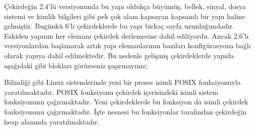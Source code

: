 \documentclass[a4paper,10pt,turkish]{sphinxmanual}
\begin{document}
\sphinxAtStartPar
Çekirdeğin 2.4’lü versiyonunda bu yapı oldukça büyümüş, bellek, sinyal, dosya sistemi ve kimlik bilgileri
gibi pek çok alanı kapsayan kapsamlı bir yapı haline gelmiştir. Bugünkü 6’lı çekirdeklerde bu yapı birkaç
sayfa uzunluğundadır. Eskiden yapının her elemanı çekirdek derlemesine dahil ediliyordu. Ancak 2.6’lı
versiyonlardan başlanarak artık yapı elemanlarının bazıları konfigürasyona bağlı olarak yapıya dahil
edilmektedir. Bu nedenle gelişmiş çekirdeklerde yapıda aşağıdaki gibi  blokları görürseniz
şaşırmayınız:

\begin{sphinxVerbatim}[commandchars=\\\{\}]



\end{sphinxVerbatim}

\sphinxAtStartPar
Bilindiği gibi Linux sistemlerinde yeni bir proses  isimli POSIX fonksiyonuyla yaratılmaktadır.
 POSIX fonksiyonu çekirdek içerisindeki  isimli sistem fonksiyonunu çağırmaktadır. Yeni
çekirdeklerde bu fonksiyon da  isimli çekirdek fonksiyonunu çağırmaktadır. İşte
 nesnesi bu fonksiyonlar tarafından çekirdeğin heap alanında yaratılmaktadır.
\end{document}
